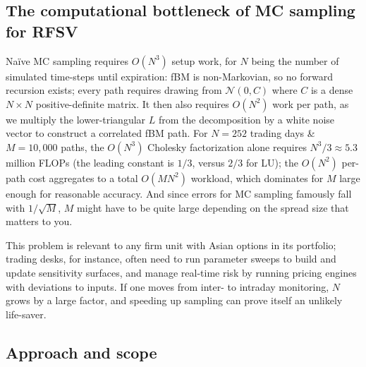 \subsection{The computational bottleneck of MC sampling for RFSV}
    
 Naïve MC sampling requires $O(N^3)$ setup work, for $N$ being the number of simulated time-steps until expiration: fBM is non-Markovian, so no forward recursion exists; every path requires drawing from $\mathcal{N}(0, C)$ where $C$ is a dense $N \times N$ positive-definite matrix. It then also requires $O(N^2)$ work per path, as we multiply the lower-triangular $L$ from the decomposition by a white noise vector to construct a correlated fBM path. For $N = 252$ trading days \& $M = 10{,}000$ paths, the $O(N^3)$ Cholesky factorization alone requires $N^3/3 \approx 5.3$ million FLOPs (the leading constant is $1/3$, versus $2/3$ for LU); the $O(N^2)$ per-path cost aggregates to a total $O(MN^2)$ workload, which dominates for $M$ large enough for reasonable accuracy. And since errors for MC sampling famously fall with $1/\sqrt M$, $M$ might have to be quite large depending on the spread size that matters to you.
 
This problem is relevant to any firm unit with Asian options in its portfolio; trading desks, for instance, often need to run parameter sweeps to build and update sensitivity surfaces, and manage real-time risk by running pricing engines with deviations to inputs. If one moves from inter- to intraday monitoring, $N$ grows by a large factor, and speeding up sampling can prove itself an unlikely life-saver.
  
\subsection{Approach and scope}